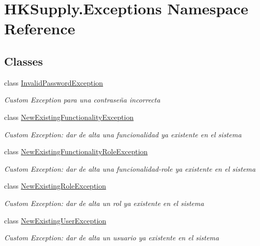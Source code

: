 \hypertarget{namespace_h_k_supply_1_1_exceptions}{}\section{H\+K\+Supply.\+Exceptions Namespace Reference}
\label{namespace_h_k_supply_1_1_exceptions}
\subsection*{Classes}
\begin{DoxyCompactItemize}
\item 
class \hyperlink{class_h_k_supply_1_1_exceptions_1_1_invalid_password_exception}{Invalid\+Password\+Exception}
\begin{DoxyCompactList}\small\item\em Custom Exception para una contraseña incorrecta \end{DoxyCompactList}\item 
class \hyperlink{class_h_k_supply_1_1_exceptions_1_1_new_existing_functionality_exception}{New\+Existing\+Functionality\+Exception}
\begin{DoxyCompactList}\small\item\em Custom Exception\+: dar de alta una funcionalidad ya existente en el sistema \end{DoxyCompactList}\item 
class \hyperlink{class_h_k_supply_1_1_exceptions_1_1_new_existing_functionality_role_exception}{New\+Existing\+Functionality\+Role\+Exception}
\begin{DoxyCompactList}\small\item\em Custom Exception\+: dar de alta una funcionalidad-\/role ya existente en el sistema \end{DoxyCompactList}\item 
class \hyperlink{class_h_k_supply_1_1_exceptions_1_1_new_existing_role_exception}{New\+Existing\+Role\+Exception}
\begin{DoxyCompactList}\small\item\em Custom Exception\+: dar de alta un rol ya existente en el sistema \end{DoxyCompactList}\item 
class \hyperlink{class_h_k_supply_1_1_exceptions_1_1_new_existing_user_exception}{New\+Existing\+User\+Exception}
\begin{DoxyCompactList}\small\item\em Custom Exception\+: dar de alta un usuario ya existente en el sistema \end{DoxyCompactList}\item 

\end{DoxyCompactItemize}
